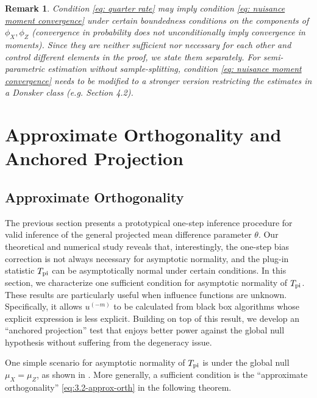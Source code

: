 \documentclass[11pt]{article}
\newtheorem{remark}{Remark}[section]
\begin{document}
\begin{remark}
    Condition \eqref{eq: quarter rate} may imply condition \eqref{eq: nuisance moment convergence} under certain boundedness conditions on the components of $\phi_X,\phi_Z$ (convergence in probability does not unconditionally imply convergence in moments). Since they are neither sufficient nor necessary for each other and control different elements in the proof, we state them separately. For semi-parametric estimation without sample-splitting, condition \eqref{eq: nuisance moment convergence} needs to be modified to a stronger version restricting the estimates in a Donsker class (e.g. \cite{kennedy2022semiparametric} Section 4.2).
\end{remark}

\section{Approximate Orthogonality and Anchored Projection }\label{section: app orthogonality}


\subsection{Approximate Orthogonality}\label{subsec:3.1-approx-orth}

The previous section presents a prototypical one-step inference procedure for valid inference of the general projected mean difference parameter $\theta$. Our theoretical and numerical study reveals that, interestingly, the one-step bias correction is not always necessary for asymptotic normality, and the plug-in statistic $T_{\rm pi}$ can be asymptotically normal under certain conditions. In this section, we characterize one sufficient condition for asymptotic normality of $T_{\rm pi}$. These results are particularly useful when influence functions are unknown. Specifically, it allows $u^{(-m)}$ to be calculated from black box algorithms whose explicit expression is less explicit. Building on top of this result, we develop an ``anchored projection'' test that enjoys better power against the global null hypothesis without suffering from the degeneracy issue.

One simple scenario for asymptotic normality of $T_{\rm pi}$ is under the global null $\mu_X = \mu_Z$, as shown in .  More generally, a sufficient condition is the ``approximate orthogonality'' \eqref{eq:3.2-approx-orth} in the following theorem.
\end{document}
